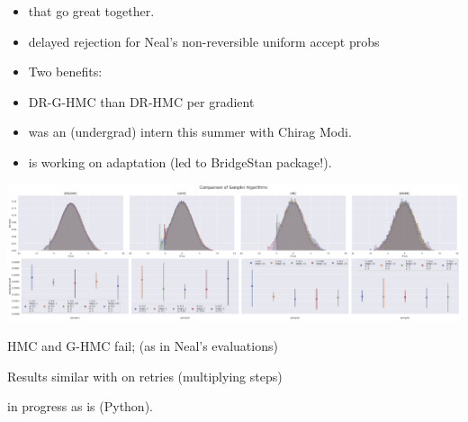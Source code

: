 \documentclass[10pt]{report}
\begin{document}
\begin{itemize}
\item {} that go great together.
\item {} delayed rejection for Neal's non-reversible uniform accept probs
\item Two benefits:
\item DR-G-HMC  than DR-HMC per gradient
\item {} was an (undergrad) intern this summer with Chirag Modi.
\item {} is working on adaptation (led to BridgeStan
  package!).
\end{itemize}

\begin{center}
  \vspace*{-18pt}
\spc \includegraphics[width=\textwidth]{img/sampler-comparison.png}
\end{center}
\vspace*{-8pt}
\begin{subitemize}
\item HMC and G-HMC fail;  (as in Neal's evaluations)
\vspace*{-4pt}
\item Results similar with  on
  retries (multiplying steps)
\vspace*{-4pt}
\item {} in progress as is  (Python).
\end{subitemize}
\end{document}
